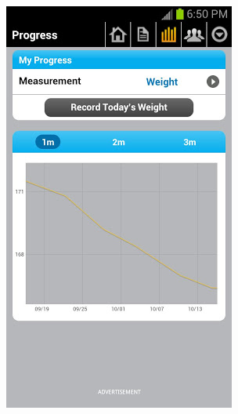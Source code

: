 \begin{enumerate}
\begin{figure}[h!t]
{\begin{subfigure}[b]{.33\textwidth}
{  \includegraphics[width=0.9\linewidth]{ch2/RelatedApps/MyFitnessPal/2.jpg}
  }
\end{subfigure}
\begin{subfigure}[b]{.33\textwidth}
  \centering
  \fbox{
}
\end{subfigure}}
\end{figure}
\end{enumerate}
